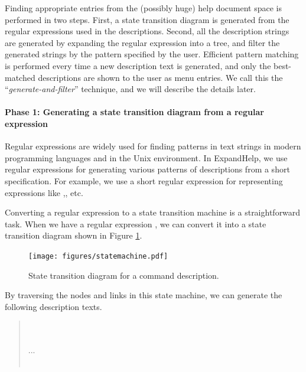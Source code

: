 \documentclass[manuscript,screen,review]{acmart}
\def\EH{\textsf{ExpandHelp}}
\begin{document}
Finding appropriate entries from the (possibly huge) help document space is
performed in two steps.
First, a state transition diagram is generated from the regular expressions
used in the descriptions.
Second, all the description strings are generated by expanding the regular expression
into a tree, and filter the generated strings by the pattern specified by the user.
Efficient pattern matching is performed every time a new description text is generated,
and only the best-matched descriptions are shown to the user as menu entries.
We call this the ``\textit{generate-and-filter}'' technique,
and we will describe the details later.

\paragraph{Phase 1: Generating a state transition diagram from a regular expression}

Regular expressions are widely used for finding patterns in text strings
in modern programming languages and in the Unix environment.
In {\EH}, we use regular expressions for
generating various patterns of descriptions from a short specification.
For example, we use a short regular expression
for representing expressions like
,, etc.

Converting a regular expression to a state transition machine is a
straightforward task.
When we have a regular expression
, 
we can convert it into a state transition diagram
shown in Figure \ref{statemachine1}.

\begin{figure}[htb]
\texttt{[image: figures/statemachine.pdf]}
\caption{State transition diagram for a  command description.}
\label{statemachine1}
\end{figure}

By traversing the nodes and links in this state machine,
we can generate the following description texts.

\begin{quote}
\small
{} \\
 \\
...\\
\\
\end{quote}
\end{document}
